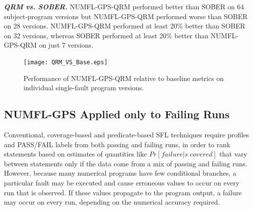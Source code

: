 \documentclass[times]{stvrauth}
\begin{document}
\textit{\textbf{ QRM vs. SOBER.}}  NUMFL-GPS-QRM performed better than SOBER on 64 subject-program versions but NUMFL-GPS-QRM performed worse than SOBER on 28 versions.  NUMFL-GPS-QRM performed at least 20\% better than SOBER on 32 versions, whereas SOBER performed at least 20\% better than NUMFL-GPS-QRM on just 7 versions.
\begin{figure}
\centering
\texttt{[image: QRM\_VS\_Base.eps]}
\caption{Performance of NUMFL-GPS-QRM relative to baseline metrics on individual single-fault program versions.}
\label{QRM_VS_Base}
\end{figure}

\subsection{NUMFL-GPS Applied only to Failing Runs}\label{VE}
Conventional, coverage-based and predicate-based SFL techniques require profiles and PASS/FAIL labels from both passing and failing runs, in order to rank statements based on estimates of quantities like $Pr⁡[failure|s\;covered]$ \cite{Baah2010} that vary between statements only if the data come from a mix of passing and failing runs.  However, because many numerical programs have few conditional branches, a particular fault may be executed and cause erroneous values to occur on every run that is observed.  If these values propagate to the program output, a failure may occur on every run, depending on the numerical accuracy required.
\end{document}
